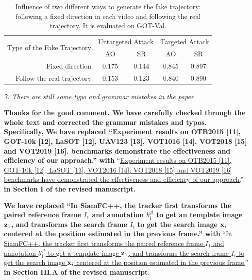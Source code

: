 \documentclass[12pt]{article}
\begin{document}
\begin{table}[t]
  \renewcommand\thetable{\ref{table:direction}}
  \centering
  \caption{Influence of two different ways to generate the fake trajectory: following a fixed direction in each video and following the real trajectory. It is evaluated on GOT-Val.}
  \begin{tabular}{@{}rcccc@{}}
  \toprule
  \multirow{2}{*}[-2pt]{Type of the Fake Trajectory} & \multicolumn{2}{c}{Untargeted Attack} & \multicolumn{2}{c}{Targeted Attack} \\ \cmidrule{2-5}
                              & AO                & SR                & AO               & SR               \\ \midrule
  Fixed direction             & 0.175             & 0.144             & 0.845            & 0.897            \\
  Follow the real trajectory  & 0.153             & 0.123             & 0.840            & 0.890            \\ \bottomrule        
  \end{tabular}
\end{table}

\textit{7. There are still some typo and grammar mistakes in the paper.}

\textbf{Thanks for the good comment. We have carefully checked through the whole text and corrected the grammar mistakes and typos. Specifically,}
\textbf{We have replaced ``Experiment results on OTB2015 [11], GOT-10k [12], LaSOT [12], UAV123 [13], VOT1016 [14], VOT2018 [15] and VOT2019 [16]. benchmarks demonstrate the effectiveness and efficiency of our approach.'' with}
``\uline{Experiment results on OTB2015 [11], GOT-10k [12], LaSOT [13], VOT2016 [14], VOT2018 [15] and VOT2019 [16] benchmarks have demonstrated the effectiveness and efficiency of our approach.}''
\textbf{in Section I of the revised manuscript.}

\textbf{We have replaced ``In SiamFC++, the tracker first transforms the paired reference frame $I_1$ and annotation $b_1^{gt}$ to get an template image $\textbf z_1$, and transforms the search frame $I_i$ to get the search image $\textbf x_i$ centered at the position estimated in the previous frame.'' with}
``\uline{In SiamFC++, the tracker first transforms the paired reference frame $I_1$ and annotation $b_1^{gt}$ to get a template image $\textbf z_1$, and transforms the search frame $I_i$ to get the search image $\textbf x_i$ centered at the position estimated in the previous frame.}''
\textbf{in Section III.A of the revised manuscript.}
\end{document}
